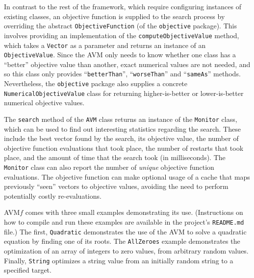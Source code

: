 \documentclass{llncs}
\newcommand{\AVM}{Alternating Variable Method\xspace}
\newcommand{\name}{AVM\hspace{-1pt}$f$\xspace}
\newcommand{\inlineheading}[1]{\vspace{1mm} \noindent {\bf #1.}}
\begin{document}
\begin{sloppypar}
\inlineheading{Objective Function} In contrast to the rest of the framework, which require configuring instances of existing classes, an objective function is supplied to the search process by overriding the abstract {\tt ObjectiveFunction} (of the {\tt objective} package). This involves providing an implementation of the {\tt computeObjectiveValue} method, which takes a {\tt Vector} as a parameter and returns an instance of an {\tt ObjectiveValue}. Since the AVM only needs to know whether one class has a ``better'' objective value than another, exact numerical values are not needed, and so this class only provides ``{\tt betterThan}'', ``{\tt worseThan}'' and ``{\tt sameAs}'' methods.
Nevertheless, the {\tt objective} package also supplies a concrete {\tt NumericalObjectiveValue} class for returning higher-is-better or lower-is-better numerical objective values.
\end{sloppypar}

\begin{sloppypar}
\inlineheading{Reporting} The {\tt search} method of the {\tt AVM} class returns an instance of the {\tt Monitor} class, which can be used to find out interesting statistics regarding the search. These include the best vector found by the search, its objective value, the number of objective function evaluations that took place, the number of restarts that took place, and the amount of time that the search took (in milliseconds). The {\tt Monitor} class can also report the number of {\it unique} objective function evaluations. The objective function can make optional usage of a cache that maps previously ``seen'' vectors to objective values, avoiding the need to perform potentially costly re-evaluations.
\end{sloppypar}

\inlineheading{Examples} \name comes with three small examples demonstrating its use. (Instructions on how to compile and run these examples are available in the project's {\tt README.md} file.) The first, {\tt Quadratic} demonstrates the use of the AVM to solve a quadratic equation by finding one of its roots. The {\tt AllZeroes} example demonstrates the optimization of an array of integers to zero values, from arbitrary random values. Finally, {\tt String} optimizes a string value from an initially random string to a specified target.
\end{document}
